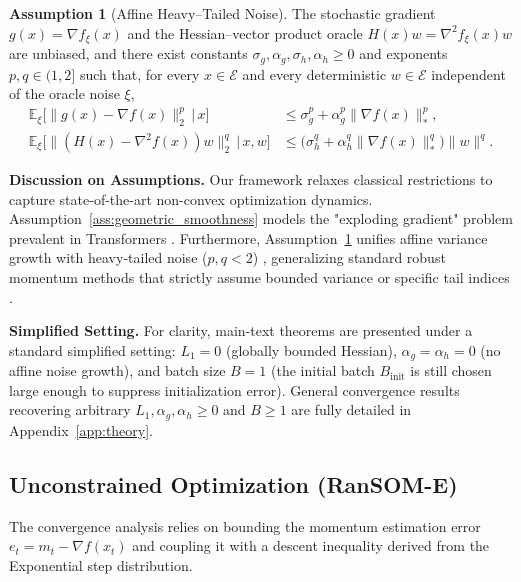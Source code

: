 \documentclass{article}
\theoremstyle{plain}
\theoremstyle{definition}
\newtheorem{assumption}[theorem]{Assumption}
\theoremstyle{remark}
\begin{document}
\begin{assumption}[Affine Heavy--Tailed Noise]
\label{ass:noise}
The stochastic gradient $g(x) = \nabla f_\xi(x)$ and the Hessian--vector
product oracle $H(x)w = \nabla^2 f_\xi(x) w$ are unbiased, and there
exist constants $\sigma_g, \alpha_g, \sigma_h, \alpha_h \geq 0$ and
exponents $p, q \in (1, 2]$ such that, for every $x \in \mathcal{E}$ and
every deterministic $w \in \mathcal{E}$ independent of the oracle noise
$\xi$,
\begin{align}
  \mathbb{E}_\xi\bigl[\|g(x) - \nabla f(x)\|_2^p \,\big|\, x\bigr]
    &\leq \sigma_g^p + \alpha_g^p \|\nabla f(x)\|_*^p, \\
  \mathbb{E}_\xi\bigl[\|(H(x) - \nabla^2 f(x))w\|_2^q \,\big|\, x, w\bigr]
    &\leq \bigl(\sigma_h^q + \alpha_h^q \|\nabla f(x)\|_*^q\bigr) \|w\|^q.
\end{align}
\end{assumption}

\textbf{Discussion on Assumptions.} Our framework relaxes classical restrictions to capture state-of-the-art non-convex optimization dynamics. Assumption~\ref{ass:geometric_smoothness} models the "exploding gradient" problem prevalent in Transformers \cite{zhang2019gradient}. Furthermore, Assumption~\ref{ass:noise} unifies affine variance growth \cite{bottou2018optimization} with heavy-tailed noise ($p, q < 2$) \cite{simsekli2019tail}, generalizing standard robust momentum methods that strictly assume bounded variance or specific tail indices \cite{cutkosky2019storm, gorbunov2020stochastic}.

\textbf{Simplified Setting.} For clarity, main-text theorems are presented under a standard simplified setting: $L_1 = 0$ (globally bounded Hessian), $\alpha_g = \alpha_h = 0$ (no affine noise growth), and batch size $B=1$ (the initial batch $B_{\mathrm{init}}$ is still chosen large enough to suppress initialization error). General convergence results recovering arbitrary $L_1, \alpha_g, \alpha_h \ge 0$ and $B \ge 1$ are fully detailed in Appendix~\ref{app:theory}.
\subsection{Unconstrained Optimization (RanSOM-E)}

The convergence analysis relies on bounding the momentum estimation error $e_t = m_t - \nabla f(x_t)$ and coupling it with a descent inequality derived from the Exponential step distribution.
\end{document}
